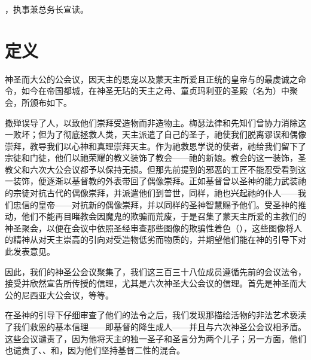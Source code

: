 ，执事兼总务长宣读。\par

\par


\section{定义}

神圣而大公的公会议，因天主的恩宠以及蒙天主所爱且正统的皇帝与的最虔诚之命令，如今在帝国都城，在神圣无玷的天主之母、童贞玛利亚的圣殿（名为）中聚会，所颁布如下。\par

撒殚误导了人，以致他们崇拜受造物而非造物主。梅瑟法律和先知们曾协力消除这一败坏；但为了彻底拯救人类，天主派遣了自己的圣子，祂使我们脱离谬误和偶像崇拜，教导我们以心神和真理崇拜天主。作为祂救恩学说的使者，祂给我们留下了宗徒和门徒，他们以祂荣耀的教义装饰了教会——祂的新娘。教会的这一装饰，圣教父和六次大公会议都予以保持无损。但那先前提到的邪恶的工匠不能忍受看到这一装饰，便逐渐以基督教的外表带回了偶像崇拜。正如基督曾以圣神的能力武装祂的宗徒对抗古代的偶像崇拜，并派遣他们到普世，同样，祂也兴起祂的仆人——我们忠信的皇帝——对抗新的偶像崇拜，并以同样的圣神智慧赐予他们。受圣神的推动，他们不能再目睹教会因魔鬼的欺骗而荒废，于是召集了蒙天主所爱的主教们的神圣聚会，以便在会议中依照圣经审查那些图像的欺骗性着色（），这些图像将人的精神从对天主崇高的引向对受造物低劣而物质的，并期望他们能在神的引导下对此发表意见。\par

因此，我们的神圣公会议聚集了，我们这三百三十八位成员遵循先前的会议法令，接受并欣然宣告所传授的信理，尤其是六次神圣大公会议的信理。首先是神圣而大公的尼西亚大公会议，等等。\par

在圣神的引导下仔细审查了他们的法令之后，我们发现那描绘活物的非法艺术亵渎了我们救恩的基本信理——即基督的降生成人——并且与六次神圣公会议相矛盾。这些会议谴责了，因为他将天主的独一圣子和圣言分为两个儿子；另一方面，他们也谴责了、、和，因为他们坚持基督二性的混合。\par

